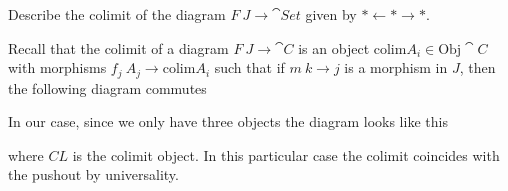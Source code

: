 \documentclass[12pt]{memoir}
\begin{document}
\begin{Ej}
    Describe the colimit of the diagram $F\: J\to\cat{Set}$ given by $\ast\leftarrow\ast\to\ast$.
\end{Ej}
\begin{ptcbr}
    Recall that the colimit of a diagram $F\: J\to\cat{C}$ is an object $\text{colim} A_i\in\text{Obj}\cat{C}$ with morphisms $f_j\: A_j\to\text{colim} A_i$ such that if $m\: k\to j$ is a morphism in $J$, then the following diagram commutes
\begin{center}
\end{center}
In our case, since we only have three objects the diagram looks like this
\begin{center}
\end{center}
where $CL$ is the colimit object. In this particular case the colimit coincides with the pushout by universality.
\end{ptcbr}
\end{document}
